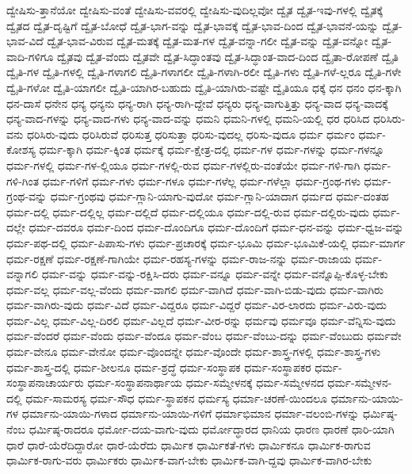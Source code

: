 {ದ್ವೇಷಿಸು-ತ್ತಾನೆಯೋ
ದ್ವೇಷಿಸು-ವಂತೆ
ದ್ವೇಷಿಸು-ವವರಲ್ಲಿ
ದ್ವೇಷಿಸು-ವುದಿಲ್ಲವೋ
ದ್ವೈತ
ದ್ವೈತ-ಇವು-ಗಳಲ್ಲಿ
ದ್ವೈತಕ್ಕೆ
ದ್ವೈತದ
ದ್ವೈತ-ದೃಷ್ಟಿಗೆ
ದ್ವೈತ-ಬೋಧೆ
ದ್ವೈತ-ಭಾಗ-ವನ್ನು
ದ್ವೈತ-ಭಾವಕ್ಕೆ
ದ್ವೈತ-ಭಾವ-ದಿಂದ
ದ್ವೈತ-ಭಾವನೆ-ಯನ್ನು
ದ್ವೈತ-ಭಾವ-ವಿದೆ
ದ್ವೈತ-ಭಾವ-ವಿರುವ
ದ್ವೈತ-ಮತಕ್ಕೆ
ದ್ವೈತ-ಮತ-ಗಳ
ದ್ವೈತ-ವನ್ನಾ-ಗಲೀ
ದ್ವೈತ-ವನ್ನು
ದ್ವೈತ-ವನ್ನೋ
ದ್ವೈತ-ವಾದಿ-ಗಳಿಗೂ
ದ್ವೈತವು
ದ್ವೈತ-ವೆಂದು
ದ್ವೈತವೇ
ದ್ವೈತ-ಸಿದ್ಧಾಂತವು
ದ್ವೈತ-ಸಿದ್ಧಾಂತ-ವಾದ-ದಿಂದ
ದ್ವೈತಾ-ರೋಪಣೆ
ದ್ವೈತಿ
ದ್ವೈತಿ-ಗಳ
ದ್ವೈತಿ-ಗಳಲ್ಲಿ
ದ್ವೈತಿ-ಗಳಾಗಲಿ
ದ್ವೈತಿ-ಗಳಾಗಲೀ
ದ್ವೈತಿ-ಗಳಾಗಿ-ರಲೀ
ದ್ವೈತಿ-ಗಳು
ದ್ವೈತಿ-ಗಳೆ-ಲ್ಲರೂ
ದ್ವೈತಿ-ಗಳೇ
ದ್ವೈತಿ-ಗಳೋ
ದ್ವೈತಿ-ಯಾಗಲೀ
ದ್ವೈತಿ-ಯಾಗಿರ-ಬಹುದು
ದ್ವೈತಿ-ಯಾಗಿರು-ವಷ್ಟೇ
ದ್ವೈತಿಯೂ
ಧಕ್ಕೆ
ಧನ
ಧನಂ
ಧನ-ಕ್ಕಾಗಿ
ಧನ-ದಾಸೆ
ಧನೇನ
ಧನ್ಯ
ಧನ್ಯನು
ಧನ್ಯ-ರಾಗಿ
ಧನ್ಯ-ರಾಗಿ-ದ್ದೇವೆ
ಧನ್ಯರು
ಧನ್ಯ-ವಾಗುತ್ತಿತ್ತು
ಧನ್ಯ-ವಾದ
ಧನ್ಯ-ವಾದಕ್ಕೆ
ಧನ್ಯ-ವಾದ-ಗಳನ್ನು
ಧನ್ಯ-ವಾದ-ಗಳು
ಧನ್ಯ-ವಾದ-ವನ್ನು
ಧಮನಿ
ಧಮನಿ-ಗಳಲ್ಲಿ
ಧಮನಿ-ಯಲ್ಲಿ
ಧರ
ಧರಿಸಿದ
ಧರಿಸಿರು-ವನು
ಧರಿಸಿರು-ವುದು
ಧರಿಸಿರುವೆ
ಧರಿಸುತ್ತ
ಧರಿಸುತ್ತಾ
ಧರಿಸು-ವುದಲ್ಲ
ಧರಿಸು-ವುದೂ
ಧರ್ಮ
ಧರ್ಮಂ
ಧರ್ಮ-ಕೋಶಸ್ಯ
ಧರ್ಮ-ಕ್ಕಾಗಿ
ಧರ್ಮ-ಕ್ಕಿಂತ
ಧರ್ಮಕ್ಕೆ
ಧರ್ಮ-ಕ್ಷೇತ್ರ-ದಲ್ಲಿ
ಧರ್ಮ-ಗಳ
ಧರ್ಮ-ಗಳನ್ನು
ಧರ್ಮ-ಗಳನ್ನೂ
ಧರ್ಮ-ಗಳಲ್ಲಿ
ಧರ್ಮ-ಗಳ-ಲ್ಲಿಯೂ
ಧರ್ಮ-ಗಳಲ್ಲಿ-ರುವ
ಧರ್ಮ-ಗಳಲ್ಲಿರು-ವಂತೆಯೇ
ಧರ್ಮ-ಗಳಿ-ಗಾಗಿ
ಧರ್ಮ-ಗಳಿ-ಗಿಂತ
ಧರ್ಮ-ಗಳಿಗೆ
ಧರ್ಮ-ಗಳು
ಧರ್ಮ-ಗಳೂ
ಧರ್ಮ-ಗಳೆಲ್ಲ
ಧರ್ಮ-ಗಳೆಲ್ಲಾ
ಧರ್ಮ-ಗ್ರಂಥ-ಗಳು
ಧರ್ಮ-ಗ್ರಂಥ-ವನ್ನು
ಧರ್ಮ-ಗ್ರಂಥವು
ಧರ್ಮ-ಗ್ಲಾನಿ-ಯಾಗು-ವುದೋ
ಧರ್ಮ-ಗ್ಲಾನಿ-ಯಾದಾಗ
ಧರ್ಮದ
ಧರ್ಮ-ದಂತಹ
ಧರ್ಮ-ದಲ್ಲಿ
ಧರ್ಮ-ದಲ್ಲಿಲ್ಲ
ಧರ್ಮ-ದಲ್ಲಿದೆ
ಧರ್ಮ-ದಲ್ಲಿಯೂ
ಧರ್ಮ-ದಲ್ಲಿ-ರುವ
ಧರ್ಮ-ದಲ್ಲಿರು-ವುದು
ಧರ್ಮ-ದಲ್ಲೇ
ಧರ್ಮ-ದವರೂ
ಧರ್ಮ-ದಿಂದ
ಧರ್ಮ-ದೊಂದಿಗೂ
ಧರ್ಮ-ದೊಂದಿಗೆ
ಧರ್ಮ-ಧನ-ವನ್ನು
ಧರ್ಮ-ಧ್ವಜ-ವನ್ನು
ಧರ್ಮ-ಪಥ-ದಲ್ಲಿ
ಧರ್ಮ-ಪಿಪಾಸು-ಗಳು
ಧರ್ಮ-ಪ್ರಚಾರಕ್ಕೆ
ಧರ್ಮ-ಭೂಮಿ
ಧರ್ಮ-ಭೂಮಿಕೆ-ಯಲ್ಲಿ
ಧರ್ಮ-ಮಾರ್ಗ
ಧರ್ಮ-ರಕ್ಷಣೆ
ಧರ್ಮ-ರಕ್ಷಣೆ-ಗಾಗಿಯೇ
ಧರ್ಮ-ರಹಸ್ಯ-ಗಳನ್ನು
ಧರ್ಮ-ರಾಜ-ನನ್ನು
ಧರ್ಮ-ರಾಜಾಯ
ಧರ್ಮ-ವನ್ನಾಗಲಿ
ಧರ್ಮ-ವನ್ನು
ಧರ್ಮ-ವನ್ನು-ರಕ್ಷಿಸಿ-ದರು
ಧರ್ಮ-ವನ್ನೂ
ಧರ್ಮ-ವನ್ನೇ
ಧರ್ಮ-ವನ್ನೊಪ್ಪಿ-ಕೊಳ್ಳ-ಬೇಕು
ಧರ್ಮ-ವಲ್ಲ
ಧರ್ಮ-ವಲ್ಲ-ವೆಂದು
ಧರ್ಮ-ವಾಗಲಿ
ಧರ್ಮ-ವಾಗಿದೆ
ಧರ್ಮ-ವಾಗಿ-ಬಿಡು-ವುದು
ಧರ್ಮ-ವಾಗಿರು
ಧರ್ಮ-ವಾಗಿರು-ವುದು
ಧರ್ಮ-ವಿದೆ
ಧರ್ಮ-ವಿದ್ದರೂ
ಧರ್ಮ-ವಿದ್ದರೆ
ಧರ್ಮ-ವಿರ-ಲಾರದು
ಧರ್ಮ-ವಿರು-ವುದು
ಧರ್ಮ-ವಿಲ್ಲ
ಧರ್ಮ-ವಿಲ್ಲ-ದಿರಲಿ
ಧರ್ಮ-ವಿಲ್ಲದೆ
ಧರ್ಮ-ವೀರ-ರನ್ನು
ಧರ್ಮವು
ಧರ್ಮವೂ
ಧರ್ಮ-ವೆನ್ನಿಸು-ವುದು
ಧರ್ಮ-ವೆಂದರೆ
ಧರ್ಮ-ವೆಂದು
ಧರ್ಮ-ವೆಂದೂ
ಧರ್ಮ-ವೆಂಬ
ಧರ್ಮ-ವೆಂಬು-ದನ್ನು
ಧರ್ಮ-ವೆಂಬುದು
ಧರ್ಮವೇ
ಧರ್ಮ-ವೇನೂ
ಧರ್ಮ-ವೇನೋ
ಧರ್ಮ-ವೊಂದನ್ನೇ
ಧರ್ಮ-ವೊಂದೇ
ಧರ್ಮ-ಶಾಸ್ತ್ರ-ಗಳಲ್ಲಿ
ಧರ್ಮ-ಶಾಸ್ತ್ರ-ಗಳು
ಧರ್ಮ-ಶಾಸ್ತ್ರ-ದಲ್ಲಿ
ಧರ್ಮ-ಶೀಲನೂ
ಧರ್ಮ-ಶ್ರದ್ಧೆ
ಧರ್ಮ-ಸಂಸ್ಥಾಪಕ
ಧರ್ಮ-ಸಂಸ್ಥಾಪಕರ
ಧರ್ಮ-ಸಂಸ್ಥಾಪನಾಚಾರ್ಯರು
ಧರ್ಮ-ಸಂಸ್ಥಾಪನಾರ್ಥಾಯ
ಧರ್ಮ-ಸಮ್ಮೇಳನಕ್ಕೆ
ಧರ್ಮ-ಸಮ್ಮೇಳನದ
ಧರ್ಮ-ಸಮ್ಮೇಳನ-ದಲ್ಲಿ
ಧರ್ಮ-ಸಾಮರಸ್ಯ
ಧರ್ಮ-ಸೌಧ
ಧರ್ಮ-ಸ್ಥಾಪಕನ
ಧರ್ಮಸ್ಯ
ಧರ್ಮಾ-ಚರಣೆ-ಯಿಂದಲೂ
ಧರ್ಮಾನು-ಯಾಯಿ-ಗಳ
ಧರ್ಮಾನು-ಯಾಯಿ-ಗಳಾದ
ಧರ್ಮಾನು-ಯಾಯಿ-ಗಳಿಗೆ
ಧರ್ಮಾಭಿಮಾನ
ಧರ್ಮಾ-ವಲಂಬಿ-ಗಳನ್ನು
ಧರ್ಮಿಷ್ಠ-ನೆಂಬ
ಧರ್ಮಿಷ್ಠ-ರಾದರೂ
ಧರ್ಮೋ-ದಯ-ವಾಗು-ವುದು
ಧರ್ಮೋದ್ಧಾರದ
ಧಾನಿಯ
ಧಾರಣ
ಧಾರಣೆ
ಧಾರಿ-ಯಾಗಿ
ಧಾರೆ
ಧಾರೆ-ಯೆರೆದಿದ್ದಾರೋ
ಧಾರೆ-ಯೆರೆದು
ಧಾರ್ಮಿಕ
ಧಾರ್ಮಿಕತೆ-ಗಳು
ಧಾರ್ಮಿಕನೂ
ಧಾರ್ಮಿಕ-ರಾಗುವ
ಧಾರ್ಮಿಕ-ರಾಗು-ವರು
ಧಾರ್ಮಿಕರು
ಧಾರ್ಮಿಕ-ವಾಗ-ಬೇಕು
ಧಾರ್ಮಿಕ-ವಾಗಿ-ದ್ದವು
ಧಾರ್ಮಿಕ-ವಾಗಿರ-ಬೇಕು
}
